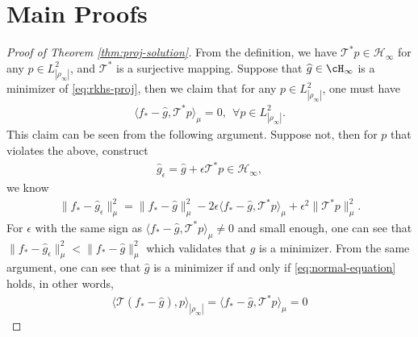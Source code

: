\documentclass[11pt]{article}
\numberwithin{equation}{section}
\begin{document}
\section{Main Proofs}
\label{sec:pf}


    \begin{proof}[Proof of Theorem \ref{thm:proj-solution}]

        From the definition, we have $\mathcal{T}^* p\in\mathcal{H}_\infty$ for any $p \in L^2_{|\rho_\infty|}$, and $\mathcal{T}^*$ is a surjective mapping. 
         Suppose that $\widehat{g} \in \cH_\infty$ is a minimizer of \eqref{eq:rkhs-proj}, then we claim that for any $p \in L^2_{|\rho_\infty|}$, one must have
        \begin{align}
            \label{eq:normal-equation}
            \langle f_* - \widehat{g}, \mathcal{T}^* p \rangle_{\mu} = 0, ~~ \forall p \in L^2_{|\rho_\infty|}.
        \end{align}
        This claim can be seen from the following argument. Suppose not, then for $p$ that violates the above, construct
        \begin{align*}
            \widehat{g}_{\epsilon} = \widehat{g} + \epsilon \mathcal{T}^* p \in \mathcal{H}_\infty,
        \end{align*}
        we know
        \begin{align}
            \|f_* - \widehat{g}_{\epsilon} \|_{\mu}^2 = \|f_* - \widehat{g} \|_{\mu}^2 - 2\epsilon \langle f_* - \widehat{g}, \mathcal{T}^* p \rangle_{\mu} + \epsilon^2  \| \mathcal{T}^* p \|_{\mu}^2 .
        \end{align}
        For $\epsilon$ with the same sign as $\langle f_* - \widehat{g}, \mathcal{T}^* p \rangle_{\mu} \neq 0$ and small enough, one can see that $\|f_* - \widehat{g}_{\epsilon} \|_{\mu}^2 < \|f_* - \widehat{g} \|_{\mu}^2$ which validates that $\widehat{g}$ is a minimizer. 
        From the same argument, one can see that $\widehat{g}$ is a minimizer if and only if \eqref{eq:normal-equation} holds, in other words,
        \begin{align}
            \langle \mathcal{T} (f_* - \widehat{g}),  p \rangle_{|\rho_\infty|} = \langle f_* - \widehat{g}, \mathcal{T}^* p \rangle_{\mu} = 0
        \end{align}
        



\end{proof}
\end{document}
